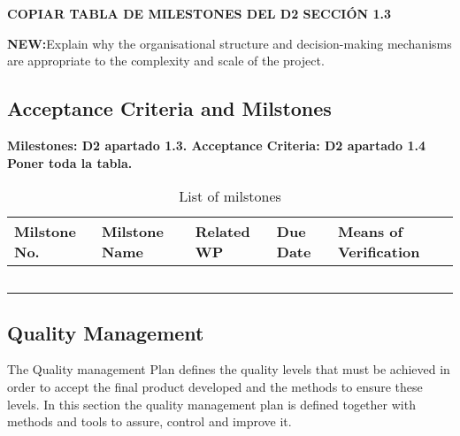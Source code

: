\textbf{COPIAR TABLA DE MILESTONES DEL D2 SECCIÓN 1.3} 


\textbf{NEW:}Explain why the organisational structure and decision-making mechanisms are appropriate to the complexity and scale of the project. 

\subsection{Acceptance Criteria and Milstones}

\textbf{Milestones: D2 apartado 1.3. Acceptance Criteria: D2 apartado 1.4 Poner toda la tabla.}


\begin{longtable}[H]{p{1.9cm} p{3cm} p{2.2cm} p{2cm} l }
	\toprule[2pt]
	
	\textbf{Milstone No.} & \textbf{Milstone Name} & \textbf{Related WP} & \textbf{Due Date} & \textbf{Means of Verification} \\
	
	\midrule[1.5pt] 
	\endhead
	
	 &  &  &  & \vspace{0.2cm} \\
	
	\midrule

	 &  &  &  & \vspace{0.2cm} \\
	
	\midrule
	
	 &  &  &  & \vspace{0.2cm} \\

	\midrule

 	 &  &  &  & \vspace{0.2cm} \\
	
	\bottomrule[2pt]
	
	\caption{List of milstones}
	\label{workpackages}
\end{longtable}

\subsection{Quality Management}

The Quality management Plan defines the quality levels that must be achieved in order to accept the final product developed and the methods to ensure these levels. In this section the quality management plan is defined together with methods and tools to assure, control and improve it.





